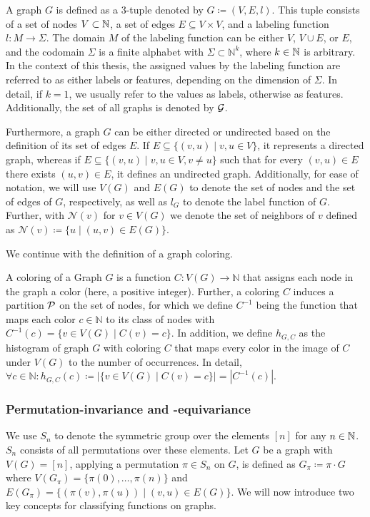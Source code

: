 \begin{definition}[Graph]
A graph $G$ is defined as a 3-tuple denoted by $G \coloneqq (V, E, l)$. This tuple consists of a set of nodes $V \subset \mathbb{N}$, a set of edges $E \subseteq V \times V$, and a labeling function $l: M \rightarrow \Sigma$. The domain $M$ of the labeling function can be either $V$, $V \cup E$, or $E$, and the codomain $\Sigma$ is a finite alphabet with $\Sigma \subset \mathbb{N}^k$, where $k \in \mathbb{N}$ is arbitrary.
In the context of this thesis, the assigned values by the labeling function are referred to as either labels or features, depending on the dimension of $\Sigma$. In detail, if $k=1$, we usually refer to the values as labels, otherwise as features. Additionally, the set of all graphs is denoted by $\mathcal{G}$.

Furthermore, a graph $G$ can be either directed or undirected based on the definition of its set of edges $E$. If $E \subseteq \{(v,u) \mid v,u \in V\}$, it represents a directed graph, whereas if $E \subseteq \{(v, u) \mid v,u \in V, v\neq u\}$ such that for every $(v,u) \in E$ there exists $(u,v) \in E$, it defines an undirected graph. Additionally, for ease of notation, we will use $V(G)$ and $E(G)$ to denote the set of nodes and the set of edges of $G$, respectively, as well as $l_G$ to denote the label function of $G$. Further, with $\mathcal{N}(v)$ for $v \in V(G)$ we denote the set of neighbors of $v$ defined as $\mathcal{N}(v) \coloneqq \{u \mid (u, v) \in E(G)\}$.
\end{definition}

We continue with the definition of a graph coloring.

\begin{definition}
A coloring of a Graph $G$ is a function $C: V(G) \rightarrow \mathbb{N}$ that assigns each node in the graph a color (here, a positive integer). Further, a coloring $C$ induces a partition $\mathcal{P}$ on the set of nodes, for which we define $C^{-1}$ being the function that maps each color $c \in \mathbb{N}$ to its class of nodes with $C^{-1}(c) = \{ v\in V(G) \mid C(v) = c\}$. In addition, we define $h_{G, C}$ as the histogram of graph $G$ with coloring $C$ that maps every color in the image of $C$ under $V(G)$ to the number of occurrences. In detail, $\forall c \in \mathbb{N}: h_{G, C}(c) \coloneqq | \{ v \in V(G) \mid C(v) = c \} | = | C^{-1}(c) |$.
\end{definition}

\subsubsection{Permutation-invariance and -equivariance}
We use $S_n$ to denote the symmetric group over the elements $[n]$ for any $n \in \mathbb{N}$. $S_n$ consists of all permutations over these elements. Let $G$ be a graph with $V(G) = [n]$, applying a permutation $\pi \in S_n$ on $G$, is defined as $G_\pi \coloneqq \pi \cdot G$ where $V(G_\pi) = \{\pi(0), \ldots, \pi(n) \}$ and $E(G_\pi) = \{ (\pi(v), \pi(u)) \mid (v,u) \in E(G)\}$. We will now introduce two key concepts for classifying functions on graphs.

